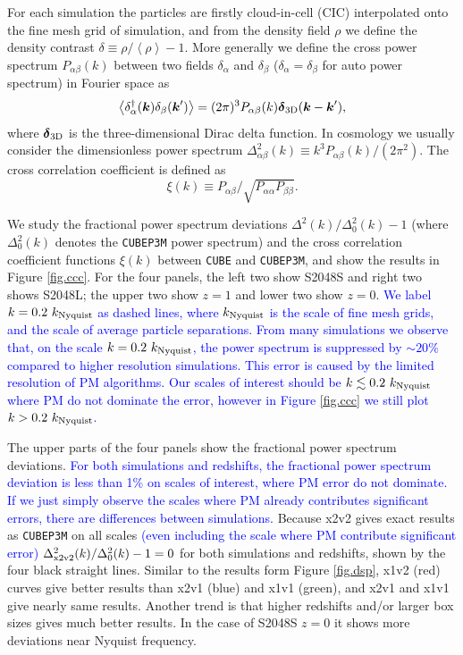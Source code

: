 \documentclass[10pt,twocolumn,preprint]{emulateapj}
\newcommand{\bs}{\boldsymbol}
\newcommand{\tcb}{\textcolor{blue}}
\begin{document}
For each simulation the particles are firstly cloud-in-cell (CIC) interpolated onto the fine mesh grid of simulation, and from the density field $\rho$ we define the density contrast $\delta\equiv \rho/\left\langle \rho \right\rangle-1$. More generally we define the cross power spectrum $P_{\alpha\beta}(k)$ between two fields $\delta_\alpha$ and $\delta_\beta$ ($\delta_\alpha=\delta_\beta$ for auto power spectrum) in Fourier space as
\begin{equation}\label{eq.cps}
	\left\langle \delta_\alpha^\dagger({\bs k})\delta_\beta({\bs k}') \right\rangle=
    (2\pi)^3 P_{\alpha\beta}(k){\bs \delta}_{\rm 3D}({\bs k}-{\bs k}'),
\end{equation}
where ${\bs \delta}_{\rm 3D}$ is the three-dimensional Dirac delta function. In cosmology we usually consider the dimensionless power spectrum $\Delta^2_{\alpha\beta}(k)\equiv k^3 P_{\alpha\beta}(k)/(2\pi^2)$. The cross correlation coefficient is defined as
\begin{equation}\label{eq.ccc}
	\xi(k)\equiv P_{\alpha\beta}/\sqrt{P_{\alpha\alpha}P_{\beta\beta}}.
\end{equation}

We study the fractional power spectrum deviations $\Delta^2(k)/\Delta^2_0(k)-1$ (where $\Delta^2_0(k)$ denotes the {\tt CUBEP3M} power spectrum) and the cross correlation coefficient functions $\xi(k)$ between {\tt CUBE} and {\tt CUBEP3M}, and show the results in Figure \ref{fig.ccc}. For the four panels, the left two show S2048S and right two shows S2048L; the upper two show $z=1$ and lower two show $z=0$. \tcb{We label $k=0.2\ k_{\rm Nyquist}$ as dashed lines, where $k_{\rm Nyquist}$ is the scale of fine mesh grids, and the scale of average particle separations. From many simulations we observe that, on the scale $k=0.2\ k_{\rm Nyquist}$, the power spectrum is suppressed by $\sim 20\%$ compared to higher resolution simulations. This error is caused by the limited resolution of PM algorithms. Our scales of interest should be $k\lesssim 0.2\ k_{\rm Nyquist}$ where PM do not dominate the error, however in Figure \ref{fig.ccc} we still plot $k> 0.2\ k_{\rm Nyquist}$.}

The upper parts of the four panels show the fractional power spectrum deviations. \tcb{For both simulations and redshifts, the fractional power spectrum deviation is less than 1\% on scales of interest, where PM error do not dominate. If we just simply observe the scales where PM already contributes significant errors, there are differences between simulations.} Because x2v2 gives exact results as {\tt CUBEP3M} on all scales \tcb{(even including the scale where PM contribute significant error)} $\Delta^2_{\rm x2v2}(k)/\Delta^2_0(k)-1=0$ for both simulations and redshifts, shown by the four black straight lines. Similar to the results form Figure \ref{fig.dsp}, x1v2 (red) curves give better results than x2v1 (blue) and x1v1 (green), and x2v1 and x1v1 give nearly same results. Another trend is that higher redshifts and/or larger box sizes gives much better results. In the case of S2048S $z=0$ it shows more deviations near Nyquist frequency.
\end{document}
